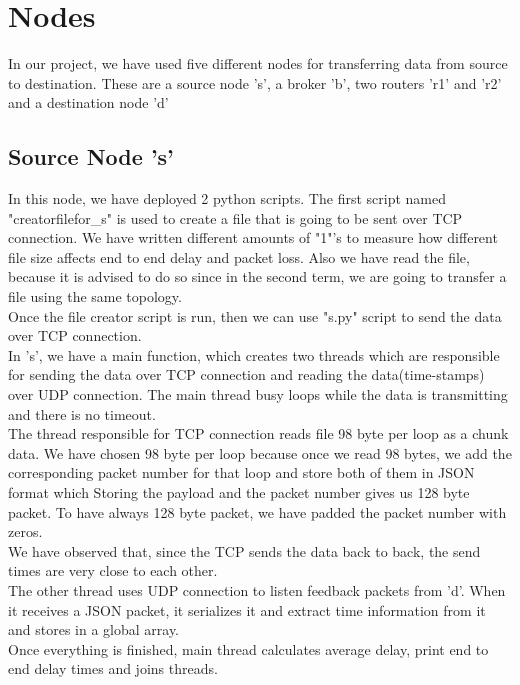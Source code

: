 \documentclass[12pt,journal,compsoc]{IEEEtran}
\begin{document}
\section{Nodes}
In our project, we have used five different nodes for transferring data from source to destination. These are a source node 's', a broker 'b', two routers 'r1' and 'r2' and a destination node 'd'

\subsection{Source Node 's'}
In this node, we have deployed 2 python scripts. The first script named "creatorfilefor\_s" is used to create a file that is going to be sent over TCP connection. We have written different amounts of "1"'s to measure how different file size affects end to end delay and packet loss. Also we have read the file, because it is advised to do so since in the second term, we are going to transfer a file using the same topology.\\
Once the file creator script is run, then we can use "s.py" script to send the data over TCP connection.\\
In 's', we have a main function, which creates two threads which are responsible for sending the data over TCP connection and reading the data(time-stamps) over UDP connection. The main thread busy loops while the data is transmitting and there is no timeout.\\
The thread responsible for TCP connection reads file 98 byte per loop as a chunk data. We have chosen 98 byte per loop because once we read 98 bytes, we add the corresponding packet number for that loop and store both of them in JSON format which Storing the payload and  the packet number gives us 128 byte packet. To have always 128 byte packet, we have padded the packet number with zeros.\\
We have observed that, since the TCP sends the data back to back, the send times are very close to each other.\\
The other thread uses UDP connection to listen feedback packets from 'd'. When it receives a JSON packet, it serializes it and extract time information from it and stores in a global array.\\
Once everything is finished, main thread calculates average delay, print end to end delay times and joins threads.
\end{document}

